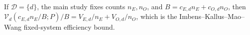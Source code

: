 If \(\mathcal D=\{d\}\), the main study fixes counts \(n_E,n_O\), and \(B=c_{E,d}n_E+c_{O,d}n_O\), then \(\mathcal V_d(c_{E,d}n_E/B;P)/B=V_{E,d}/n_E+V_{O,d}/n_O\), which is the Imbens--Kallus--Mao--Wang fixed-system efficiency bound.